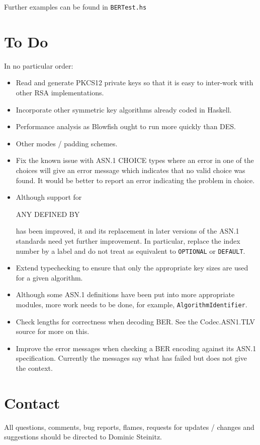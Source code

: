 \documentclass{article}
\begin{document}
Further examples can be found in {\tt BERTest.hs}

\section{To Do}

In no particular order:

\begin{itemize}
\item
Read and generate PKCS12 private keys so that it is easy to inter-work 
with other RSA implementations.
\item
Incorporate other symmetric key algorithms already coded in Haskell.
\item
Performance analysis as Blowfish ought to run more quickly than DES.
\item
Other modes / padding schemes.
\item
Fix the known issue  with ASN.1 CHOICE types where an error in one
of the choices will give an error message which indicates that no valid
choice was found. It would be better to report an error indicating the
problem in choice.
\item
Although support for
{\begin{tt}ANY DEFINED BY\end{tt}} has been improved, it and its replacement
in later versions of the ASN.1 standards need yet further improvement.
In particular, replace the index
number by a label and do not treat as equivalent to {\tt OPTIONAL} or
{\tt DEFAULT}.
\item
Extend typechecking to ensure that only the appropriate key sizes are used
for a given algorithm.
\item
Although some 
ASN.1 definitions have been put into more appropriate modules, more work
needs to be done, for example,
{\tt AlgorithmIdentifier}.
\item
Check lengths for correctness when decoding BER. See the Codec.ASN1.TLV
source for more on this.
\item
Improve the error messages when checking a BER encoding against its ASN.1
specification. Currently the messages say what has failed but does not
give the context.
\end{itemize}

\section{Contact}

All questions, comments, bug reports, flames, requests for 
updates / changes and suggestions should be directed to Dominic Steinitz.
\end{document}
